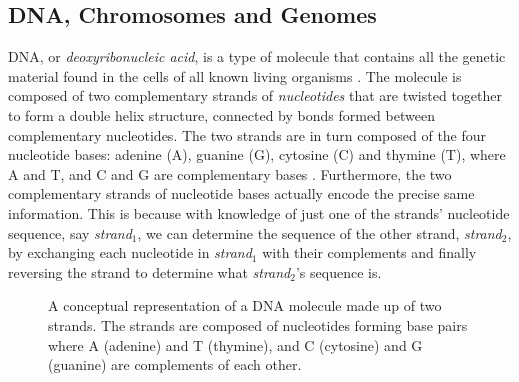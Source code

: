 \subsection{DNA, Chromosomes and Genomes} \label{background:dna_chromosomes_and_genomes}

DNA, or \textit{deoxyribonucleic acid}, is a type of molecule that contains all the genetic material found in the cells of all known living organisms \cite{nhgri_dna}. 
The molecule is composed of two complementary strands of \textit{nucleotides} that are twisted together to form a double helix structure, connected by bonds formed between complementary nucleotides.
The two strands are in turn composed of the four nucleotide bases: adenine (A), guanine (G), cytosine (C) and thymine (T), where A and T, and C and G are complementary bases \cite[p.15]{singh}.
Furthermore, the two complementary strands of nucleotide bases actually encode the precise same information.
This is because with knowledge of just one of the strands' nucleotide sequence, say \textit{strand$_1$}, we can determine the sequence of the other strand, \textit{strand$_2$}, by exchanging each nucleotide in \textit{strand$_1$} with their complements and finally reversing the strand to determine what \textit{strand$_2$}'s sequence is.

\begin{figure}[H]
\begin{center}
\caption{A conceptual representation of a DNA molecule made up of two strands. The strands are composed of nucleotides forming base pairs where A (adenine) and T (thymine), and C (cytosine) and G (guanine) are complements of each other.}
\label{background:dna_and_chromosomes:figures:dna_strands}
\end{center}
\end{figure}

